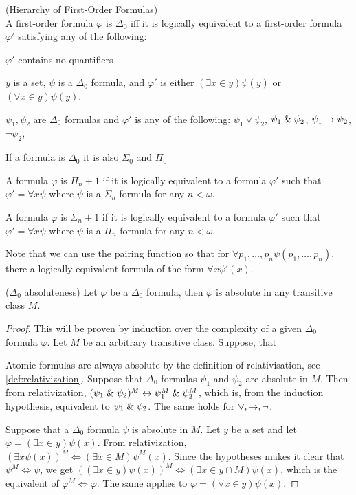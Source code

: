 \begin{definition}{(Hierarchy of First-Order Formulas)}\\
\bce[(I)]
A first-order formula $\varphi$ is $\Delta_0$ iff it is logically equivalent to a first-order formula $\varphi'$ satisfying any of the following:
\bce[(i)]
\item $\varphi'$ contains no quantifiers
\item $y$ is a set, $\psi$ is a $\Delta_0$ formula, and $\varphi'$ is either $(\exists x \in y)\psi(y)$ or $(\forall x \in y)\psi(y)$.
\item $\psi_1, \psi_2$ are $\Delta_0$ formulas and $\varphi'$ is any of the following: $\psi_1 \lor \psi_2$, $\psi_1 \mathrel{\&} \psi_2$, $\psi_1 \rightarrow \psi_2$, $\neg \psi_2$, 
\ece
\item If a formula is $\Delta_0$ it is also $\Sigma_0$ and $\Pi_0$
\item A formula $\varphi$ is $\Pi_n+1$ if it is logically equivalent to a formula $\varphi'$ such that $\varphi' = \forall x \psi$ where $\psi$ is a $\Sigma_n$-formula for any $n < \omega$.
\item A formula $\varphi$ is $\Sigma_n+1$ if it is logically equivalent to a formula $\varphi'$ such that $\varphi' = \forall x \psi$ where $\psi$ is a $\Pi_n$-formula for any $n < \omega$.
\ece
\end{definition}
Note that we can use the pairing function so that for $\forall p_1, \ldots, p_n \psi(p_1, \ldots, p_n)$, there a logically equivalent formula of the form $\forall x \psi'(x)$.

\begin{lemma}{($\Delta_0$ absoluteness)}\label{lemma:delta_0_absoluteness}
Let $\varphi$ be a $\Delta_0$ formula, then $\varphi$ is absolute in any transitive class $M$.
\end{lemma}

\begin{proof}
This will be proven by induction over the complexity of a given $\Delta_0$ formula $\varphi$. Let $M$ be an arbitrary transitive class. Suppose, that 

Atomic formulas are always absolute by the definition of relativisation, see \ref{def:relativization}.
Suppose that $\Delta_0$ formulas $\psi_1$ and $\psi_2$ are absolute in $M$. Then from relativization, $(\psi_1 \mathrel{\&} \psi_2)^M \leftrightarrow \psi_1^M \mathrel{\&} \psi_2^M$, which is, from the induction hypothesis, equivalent to $\psi_1 \mathrel{\&} \psi_2$. The same holds for $\lor, \rightarrow, \neg$.

Suppose that a $\Delta_0$ formula $\psi$ is absolute in $M$. Let $y$ be a set and let $\varphi = (\exists x \in y) \psi(x)$. 
From relativization, $(\exists x \psi(x))^M \iff (\exists x \in M) \psi^M(x)$. Since the hypotheses makes it clear that $\psi^M \iff \psi$, we get $((\exists x \in y) \psi(x))^M \iff (\exists x \in y\cap M) \psi(x)$, which is the equivalent of $\varphi^M \iff \varphi$. The same applies to $\varphi = (\forall x \in y) \psi(x)$.
\end{proof}

